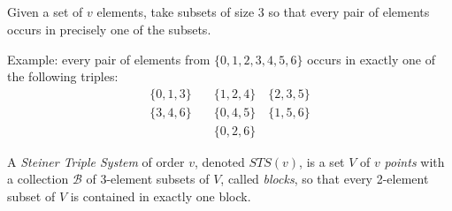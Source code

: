 \subsection{}

\begin{frame}
\begin{problem}[Steiner, 1853]
Given a set of $v$ elements, take subsets of size $3$ so that every pair of
elements occurs in precisely one of the subsets.
\end{problem}

\pause

Example: every pair of elements from $\{0, 1, 2, 3, 4, 5, 6\}$ occurs in
exactly one of the following triples:
\begin{align*}
    \{0, 1, 3\} \quad &\{1, 2, 4\} \quad \{2, 3, 5\} \\
    \{3, 4, 6\} \quad &\{0, 4, 5\} \quad \{1, 5, 6\} \\
    &\{0, 2, 6\}
\end{align*}

\pause

\begin{definition}
A {\em Steiner Triple System} of order $v$, denoted $STS(v)$, is a
set $V$ of $v$ {\em points} with a collection $\mathcal{B}$ of 3-element
subsets of $V$, called {\em blocks}, so that every 2-element subset of $V$ is
contained in exactly one block.
\end{definition}

\end{frame}

